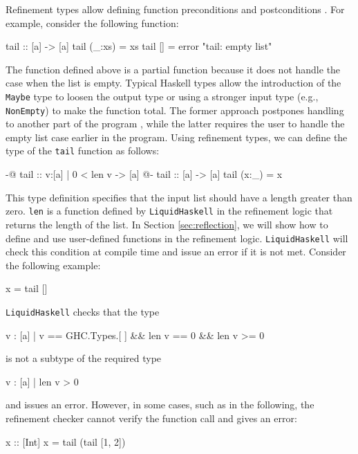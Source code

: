 \documentclass[]{rptuseminar}
\begin{document}
Refinement types allow defining function preconditions and postconditions \cite{jhala_programming_2020}. 
For example, consider the following function:

\begin{haskell}
 tail :: [a] -> [a]
 tail (_:xs) = xs
 tail [] = error "tail: empty list"
\end{haskell}

The function defined above is a partial function because it does not handle the case when the list is empty. 
Typical Haskell types allow the introduction of the \texttt{Maybe} type to loosen the output type or using a stronger input type (e.g., \texttt{NonEmpty}) to make the function total.  
The former approach postpones handling to another part of the program \cite{jhala_programming_2020}, while the latter requires the user to handle the empty list case earlier in the program.
Using refinement types, we can define the type of the \texttt{tail} function as follows:

\begin{haskell}
{-@ tail :: {v:[a] | 0 < len v} -> [a] @-}
 tail :: [a] -> [a]
 tail (x:_) = x
\end{haskell}

This type definition specifies that the input list should have a length greater than zero.
\texttt{len} is a function defined by \texttt{LiquidHaskell} in the refinement logic that returns the length of the list.
In Section \ref{sec:reflection}, we will show how to define and use user-defined functions in the refinement logic.
\texttt{LiquidHaskell} will check this condition at compile time and issue an error if it is not met.
Consider the following example:
\begin{haskell}
x = tail []
\end{haskell}
\texttt{LiquidHaskell} checks that the type 
\begin{haskell}
{v : [a] | v == GHC.Types.[ ] && len v == 0 && len v >= 0}
\end{haskell}
is not a subtype of the required type 

\begin{haskell}
{v : [a] | len v > 0}
\end{haskell}
and issues an error. However, in some cases, such as in the following, the refinement checker cannot verify the function call and gives an error:
\begin{haskell}
 x :: [Int]
 x = tail (tail [1, 2])
\end{haskell}
\end{document}
